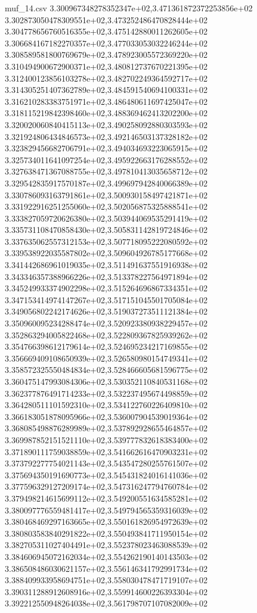 \begin{filecontents*}{muf_14.csv}
3.300967348278352347e+02,3.471361872372253856e+02
3.302873050478309551e+02,3.473252486470828444e+02
3.304778656760516355e+02,3.475142880011262605e+02
3.306684167182270357e+02,3.477033053032246244e+02
3.308589581800769679e+02,3.478923005572369220e+02
3.310494900672900371e+02,3.480812737670221395e+02
3.312400123856103278e+02,3.482702249364592717e+02
3.314305251407362789e+02,3.484591540694100331e+02
3.316210283383751971e+02,3.486480611697425047e+02
3.318115219842398460e+02,3.488369462413202200e+02
3.320020060840415113e+02,3.490258092880303593e+02
3.321924806434846573e+02,3.492146503137328182e+02
3.323829456682706791e+02,3.494034693223065915e+02
3.325734011641097254e+02,3.495922663176288552e+02
3.327638471367088755e+02,3.497810413035658712e+02
3.329542835917570187e+02,3.499697942840066389e+02
3.330786093163791861e+02,3.500930158497421871e+02
3.331922916251255060e+02,3.502056875325888541e+02
3.333827059720626380e+02,3.503944069535291419e+02
3.335731108470858430e+02,3.505831142819724846e+02
3.337635062557312153e+02,3.507718095222080592e+02
3.339538922035587802e+02,3.509604926785177668e+02
3.341442686961019035e+02,3.511491637551916938e+02
3.343346357388966226e+02,3.513378227564971894e+02
3.345249933374902298e+02,3.515264696867334351e+02
3.347153414974147267e+02,3.517151045501705084e+02
3.349056802242174626e+02,3.519037273511121384e+02
3.350960095234288474e+02,3.520923380938229457e+02
3.352863294005822468e+02,3.522809367825939262e+02
3.354766398612179614e+02,3.524695234217169855e+02
3.356669409108650939e+02,3.526580980154749341e+02
3.358572325550484834e+02,3.528466605681596775e+02
3.360475147993084306e+02,3.530352110840531168e+02
3.362377876491714233e+02,3.532237495674498859e+02
3.364280511101592310e+02,3.534122760226409810e+02
3.366183051878095966e+02,3.536007904539019364e+02
3.368085498876289989e+02,3.537892928655464857e+02
3.369987852151521110e+02,3.539777832618383400e+02
3.371890111759038859e+02,3.541662616470903231e+02
3.373792277754021143e+02,3.543547280255761507e+02
3.375694350191690773e+02,3.545431824016141036e+02
3.377596329127209174e+02,3.547316247794760784e+02
3.379498214615699112e+02,3.549200551634585281e+02
3.380097776559481417e+02,3.549794565359316039e+02
3.380468469297163665e+02,3.550161826954972639e+02
3.380803583840291822e+02,3.550493841711950154e+02
3.382705311027404491e+02,3.552378023463088539e+02
3.384606945072162034e+02,3.554262190140143503e+02
3.386508486030621157e+02,3.556146341792991734e+02
3.388409933958694751e+02,3.558030478471719107e+02
3.390311288912608916e+02,3.559914600226393304e+02
3.392212550948264038e+02,3.561798707107082009e+02

\end{filecontents*}
